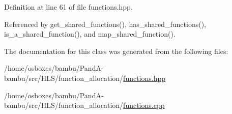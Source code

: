 Definition at line 61 of file functions.\+hpp.



Referenced by get\+\_\+shared\+\_\+functions(), has\+\_\+shared\+\_\+functions(), is\+\_\+a\+\_\+shared\+\_\+function(), and map\+\_\+shared\+\_\+function().



The documentation for this class was generated from the following files\+:\begin{DoxyCompactItemize}
\item 
/home/osboxes/bambu/\+Pand\+A-\/bambu/src/\+H\+L\+S/function\+\_\+allocation/\hyperlink{functions_8hpp}{functions.\+hpp}\item 
/home/osboxes/bambu/\+Pand\+A-\/bambu/src/\+H\+L\+S/function\+\_\+allocation/\hyperlink{functions_8cpp}{functions.\+cpp}\end{DoxyCompactItemize}
